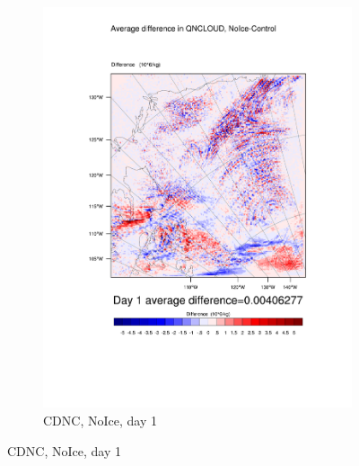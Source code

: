 \begin{figure}
\begin{subfigure}{0.40\textwidth}
		\includegraphics[width=\textwidth]{results/noice/diff_NoIce_QNCLOUD_Day1.pdf}
		\caption{CDNC, NoIce, day 1}
		\label{subfig:CDNCr2Day1}
	\end{subfigure}
	

\end{figure}

